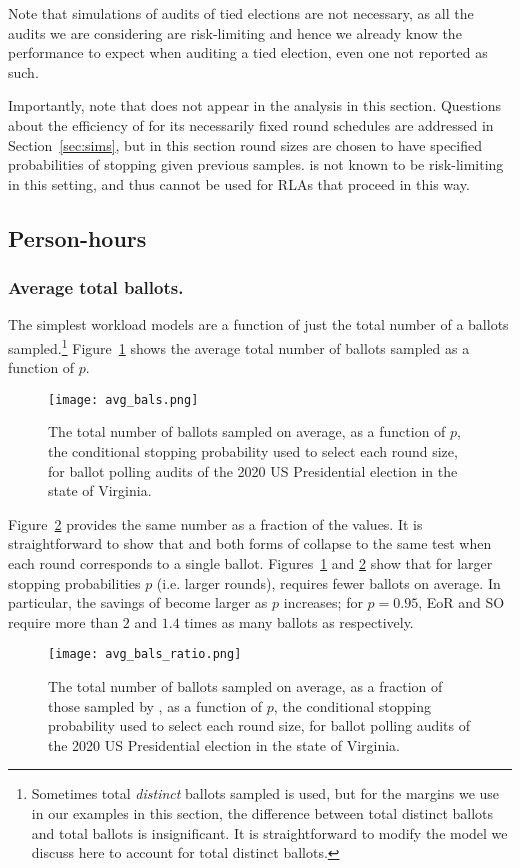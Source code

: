 Note that simulations of audits of tied elections are not necessary, as all the audits we are considering are risk-limiting and hence we already know the performance to expect when auditing a tied election, even one not reported as such. 

Importantly, note that \Minerva does not appear in the analysis in this section. 
Questions about the efficiency of \Minerva for its necessarily fixed round schedules are addressed in Section~\ref{sec:sims}, but in this section round sizes are chosen to have specified probabilities of stopping given previous samples. \Minerva is not known to be risk-limiting in this setting, and thus cannot be used for RLAs that proceed in this way.

\subsection{Person-hours}

\subsubsection{Average total ballots.} 
The simplest workload models are a function of just the total number of a ballots sampled.\footnote{Sometimes total \emph{distinct} ballots sampled is used, but for the margins we use in our examples in this section, the difference between total distinct ballots and total ballots is insignificant\cite{arxiv_athena}. It is straightforward to modify the model we discuss here to account for total distinct ballots.} Figure~\ref{fig:avg_bals} shows the average total number of ballots sampled as a function of $p$.
\begin{figure}[h!]
\texttt{[image: avg\_bals.png]}
\caption{The total number of ballots sampled on average, as a function of $p$, the conditional stopping probability used to select each round size, for ballot polling audits of the 2020 US Presidential election in the state of Virginia.}
\label{fig:avg_bals}
\end{figure}

Figure~\ref{fig:avg_bals_ratio} provides the same number as a fraction of the \Providence values.
It is straightforward to show that \Providence and both forms of \BRAVO collapse to the same test when each round corresponds to a single ballot. Figures~\ref{fig:avg_bals} and \ref{fig:avg_bals_ratio} show that for larger stopping probabilities $p$ (i.e. larger rounds), \Providence requires fewer ballots on average. In particular, the savings of \Providence become larger as $p$ increases; for $p=0.95$, EoR \BRAVO and SO \BRAVO require more than $2$ and $1.4$ times as many ballots as \Providence respectively. 
\begin{figure}[h!]
\texttt{[image: avg\_bals\_ratio.png]}
\caption{The total number of ballots sampled on average, as a fraction of those sampled by \Providence, as a function of $p$, the conditional stopping probability used to select each round size, for ballot polling audits of the 2020 US Presidential election in the state of Virginia.}
\label{fig:avg_bals_ratio}
\end{figure}


